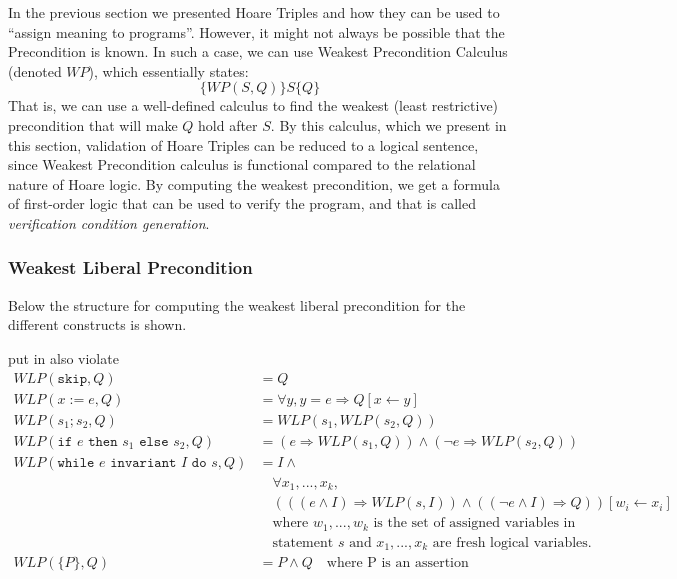 

In the previous section we presented Hoare Triples and how they can be used to ``assign meaning to programs''. However, it might not always be possible that the Precondition is known. In such a case, we can use Weakest Precondition Calculus (denoted $WP$), which essentially states:
$$
 \{WP(S,Q)\}S\{Q\}
$$
That is, we can use a well-defined calculus to find the weakest (least restrictive) precondition that will make $Q$ hold after $S$. By this calculus, which we present in this section, validation of Hoare Triples can be reduced to a logical sentence, since Weakest Precondition calculus is functional compared to the relational nature of Hoare logic.
By computing the weakest precondition, we get a formula of first-order logic that can be used to verify the program, and that is called \textit{verification condition generation}.

\subsubsection{Weakest Liberal Precondition}
Below the structure for computing the weakest liberal precondition for the different constructs is shown.

put in also violate
\begin{align*}
	WLP(\texttt{skip}, Q) &= Q \\
	WLP(x:=e,Q) &= \forall y, y = e \Rightarrow Q[x \leftarrow y] \\
	WLP(s_1;s_2, Q) &= WLP(s_1, WLP(s_2, Q)) \\
	WLP(\texttt{if } e \texttt{ then } s_1 \texttt{ else } s_2, Q) &= (e \Rightarrow WLP(s_1, Q)) \land (\neg e \Rightarrow WLP(s_2, Q)) \\
	WLP(\texttt{while } e \texttt{ invariant } I \texttt{ do } s, Q) &= 
		I \land \\
    &\quad \forall x_1, ..., x_k, \\
    &\quad (((e \land I) \Rightarrow WLP(s, I)) \land (( \neg e \land I) \Rightarrow Q))
       [w_i \leftarrow x_i] \\
	&\quad \text{where } w_1, ..., w_k \text{ is the set of assigned variables in} \\
  &\quad \text{statement } s \text{ and } x_1, ..., x_k \text{ are fresh logical variables.} \\
  WLP(\{P\}, Q) &= P \land Q \quad \text{where P is an assertion}
\end{align*}

